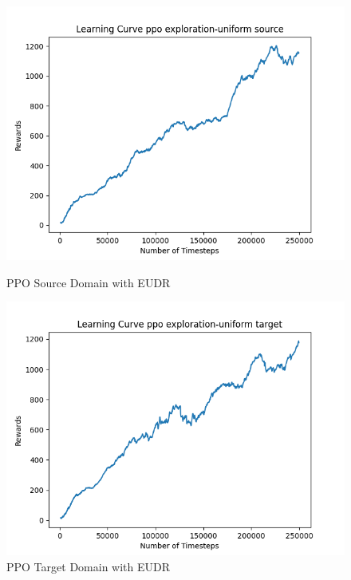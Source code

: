 \documentclass[11pt]{article}
\begin{document}
\begin{figure}[H]
    \begin{minipage}{0.45\textwidth}
        \centering
        \includegraphics[width=\textwidth]{../images/Learning_Curve_PPO_EU_Source.png}
        \caption{PPO Source Domain with EUDR}
        \label{fig:ppo_source_eudr}
    \end{minipage}
    \hfill
    \begin{minipage}{0.45\textwidth}
        \centering
        \includegraphics[width=\textwidth]{../images/Learning_Curve_PPO_EU_Target.png}
        \caption{PPO Target Domain with EUDR}
        \label{fig:ppo_target_eudr}
    \end{minipage}
\end{figure}
\end{document}
